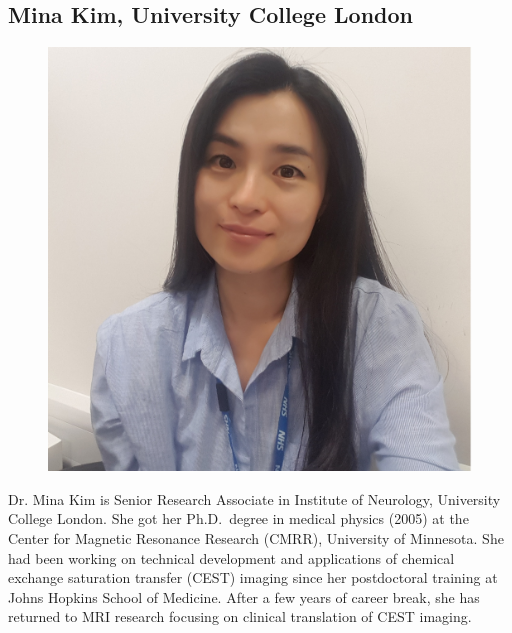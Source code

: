\documentclass[a5paper,10pt,twoside,onecolumn,openany,helvetica,showtrims]{memoir}
\newlength{\SpeakerSize}
\begin{document}
\begin{vplace}[1]
\section*{Mina Kim, University College London}
\begin{figure}
\includegraphics[width=\SpeakerSize]{SpeakerPics/image3}	
\end{figure}
Dr. Mina Kim is Senior Research Associate in Institute of Neurology, University College London. She got her Ph.D.~degree in medical physics (2005) at the Center for Magnetic Resonance Research (CMRR), University of Minnesota. She had been working on technical development and applications of chemical exchange saturation transfer (CEST) imaging since her postdoctoral training at Johns Hopkins School of Medicine. After a few years of career break, she has returned to MRI research focusing on clinical translation of CEST imaging.


\end{vplace}
\end{document}
